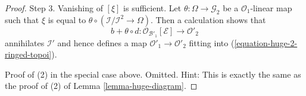 \begin{proof}
\medskip\noindent
Step 3. Vanishing of $[\xi]$ is sufficient. Let
$\theta : \Omega \to \mathcal{G}_2$ be a $\mathcal{O}_1$-linear map
such that $\xi$ is equal to
$\theta \circ (\mathcal{I}/\mathcal{I}^2 \to \Omega)$.
Then a calculation shows that
$$
b + \theta \circ d :
\mathcal{O}_{\mathcal{B}'_1}[\mathcal{E}]
\longrightarrow
\mathcal{O}'_2
$$
annihilates $\mathcal{I}'$ and hence defines a map
$\mathcal{O}'_1 \to \mathcal{O}'_2$ fitting into
(\ref{equation-huge-2-ringed-topoi}).

\medskip\noindent
Proof of (2) in the special case above. Omitted. Hint:
This is exactly the same as the proof of (2) of
Lemma \ref{lemma-huge-diagram}.
\end{proof}
